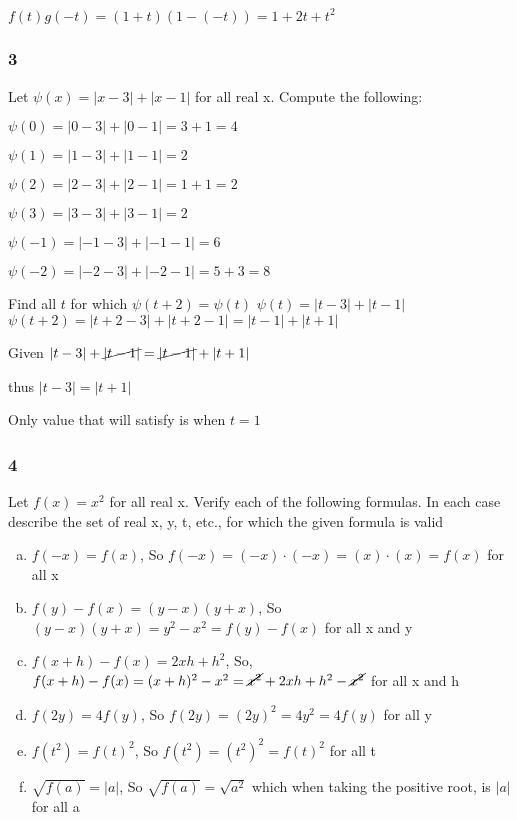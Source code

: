 \documentclass{report}
\begin{document}
$f(t)g(-t) = (1 + t)(1 - (-t)) = 1 + 2t + t^2$

\subsubsection{3}

Let $\psi(x) = |x - 3| + |x -1|$ for all real x. Compute the following:

$\psi(0) = |0 - 3| + |0 - 1| = 3 + 1 = 4$

$\psi(1) = |1 - 3| + |1 - 1| = 2$

$\psi(2) = |2 - 3| + |2 - 1| = 1 + 1 = 2$

$\psi(3) = |3 - 3| + |3 - 1| = 2$

$\psi(-1) = |-1 - 3| + |-1 - 1| = 6$

$\psi(-2) = |-2 - 3| + |-2 - 1| = 5 + 3 = 8$

Find all $t$ for which $\psi(t + 2) = \psi(t)$
$\psi(t) = |t - 3| + |t - 1|$
$\psi(t+2) = |t + 2 - 3| + |t + 2 - 1| = |t - 1| + |t + 1| $

Given $|t - 3| + \cancel{|t - 1|} = \cancel{|t - 1|} + |t + 1|$ 

thus $|t - 3| = |t + 1|$

Only value that will satisfy is when $t = 1$

\subsubsection{4}

Let $f(x) = x^2$ for all real x. Verify each of the following formulas. In each case describe the set of real x, y, t, etc., for which the given formula is valid

\begin{enumerate}[(a)]
	\item $f(-x) = f(x)$, So $	f(-x) =(-x)\cdot(-x) = (x) \cdot (x) = f(x)$ for all x
	\item $f(y) - f(x) = (y-x)(y+x)$, So $(y-x)(y+x) = y^2 - x^2 = f(y) - f(x)$ for all x and y
	\item $f(x+h) - f(x) = 2xh + h^2$, So, $f(x+h) - f(x) = (x+h)^2 - x^2 = \cancel{x^2} + 2xh + h^2 - \cancel{x^2}$ for all x and h
	\item $f(2y) = 4f(y)$, So $f(2y) = (2y)^2 = 4y^2 = 4f(y)$ for all y
	\item $f(t^2) = f(t)^2$, So $f(t^2) = (t^2)^2 = f(t)^2$ for all t
	\item $\sqrt{f(a)} = |a|$, So $\sqrt{f(a)} = \sqrt{a^2}$ which when taking the positive root, is $|a|$ for all a
\end{enumerate}
\end{document}
